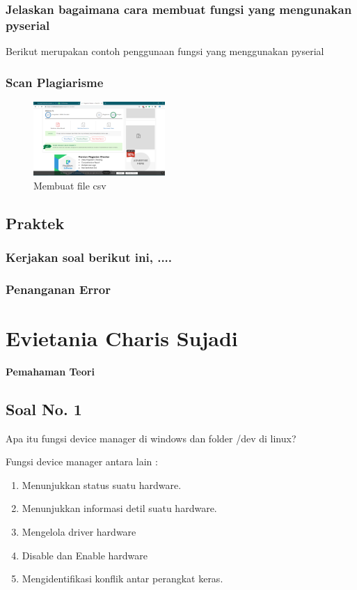 \subsubsection{Jelaskan bagaimana cara membuat fungsi yang mengunakan pyserial}


Berikut merupakan contoh penggunaan fungsi yang menggunakan pyserial


\subsubsection{Scan Plagiarisme}
\begin{figure}[H] 
\includegraphics[width=5cm]{figures/5/Teori/1174005/nopla.png}
\centering
\caption{Membuat file csv}
\end{figure}

\subsection{Praktek}
\subsubsection{Kerjakan soal berikut ini, ....}
\subsubsection{Penanganan Error} 

\section{Evietania Charis Sujadi}
{\Large \textbf{Pemahaman Teori}}
\subsection{Soal No. 1}
Apa itu fungsi device manager di windows dan folder /dev di linux?

\hfill \break
Fungsi device manager antara lain :
\begin{enumerate}
    \item Menunjukkan status suatu hardware.
    \item Menunjukkan informasi detil suatu hardware.
    \item Mengelola driver hardware
    \item Disable dan Enable hardware
    \item Mengidentifikasi konflik antar perangkat keras.
\end{enumerate}


